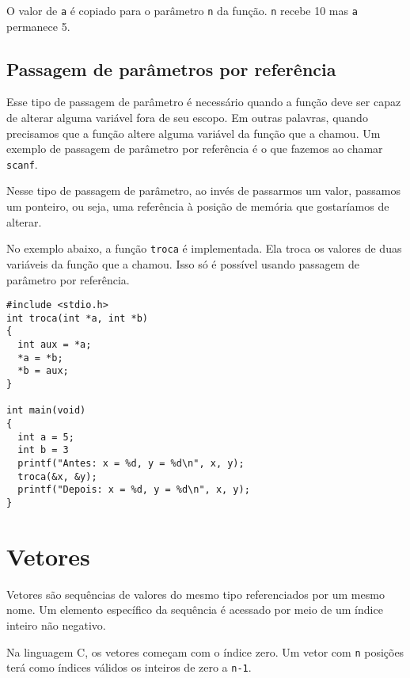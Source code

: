 \documentclass{book}
\newcommand{\SCANF}{{\tt scanf}}
\begin{document}
O valor de {\tt a} é copiado para o parâmetro {\tt n} da função. {\tt n} recebe 10 mas {\tt a} permanece 5.


\section{Passagem de parâmetros por referência}

Esse tipo de passagem de parâmetro é necessário quando a função deve ser capaz de alterar alguma variável fora de seu escopo. Em outras palavras, quando precisamos que a função altere alguma variável da função que a chamou. Um exemplo de passagem de parâmetro por referência é o que fazemos ao chamar \SCANF.

Nesse tipo de passagem de parâmetro, ao invés de passarmos um valor, passamos um ponteiro, ou seja, uma referência à posição de memória que gostaríamos de alterar.

No exemplo abaixo, a função {\tt troca} é implementada. Ela troca os valores de duas variáveis da função que a chamou. Isso só é possível usando passagem de parâmetro por referência.

\begin{lstlisting}
#include <stdio.h>
int troca(int *a, int *b)
{
  int aux = *a;
  *a = *b;
  *b = aux;
}

int main(void)
{
  int a = 5;
  int b = 3
  printf("Antes: x = %d, y = %d\n", x, y);
  troca(&x, &y);
  printf("Depois: x = %d, y = %d\n", x, y);
}
\end{lstlisting}



\chapter{Vetores}

Vetores são sequências de valores do mesmo tipo referenciados por um mesmo nome. Um elemento específico da sequência é acessado por meio de um índice inteiro não negativo.

Na linguagem C, os vetores começam com o índice zero. Um vetor com {\tt n} posições terá como índices válidos os inteiros de zero a {\tt n-1}.

\end{document}
